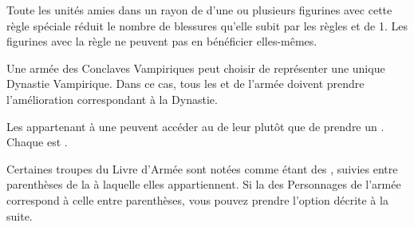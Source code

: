 \armyspecialruleentry{\necromanticaura}

Toute les unités amies dans un rayon de  d'une ou plusieurs figurines avec cette règle spéciale réduit le nombre de blessures qu'elle subit par les règles \ashestoashes{} et \unstable{} de 1. Les figurines avec la règle \necromanticaura{} ne peuvent pas en bénéficier elles-mêmes.


\closearmyspecialrules



\spaceaftersection{}

Une armée des Conclaves Vampiriques peut choisir de représenter une unique Dynastie Vampirique. Dans ce cas, tous les \vampirelords{} et \vampireheroes{} de l'armée doivent prendre l'amélioration correspondant à la Dynastie.


Les \vampirelords{} appartenant à une \bloodline{} peuvent accéder au \ancientbloodpower{} de leur \bloodline{} plutôt que de prendre un \bloodpower{}. Chaque \ancientbloodpower{} est \oneofakind{}.


Certaines troupes du Livre d'Armée sont notées comme étant des \bloodties{}, suivies entre parenthèses de la \bloodline{} à laquelle elles appartiennent. Si la \bloodline{} des Personnages \vampires{} de l'armée correspond à celle entre parenthèses, vous pouvez prendre l'option décrite à la suite.


